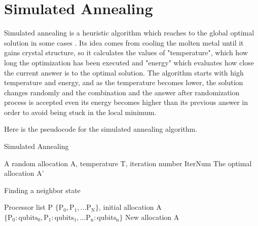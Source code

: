 \section{Simulated Annealing}
Simulated annealing is a heuristic algorithm which reaches to the global optimal solution in some cases \cite{simulatedannealing, Boltzmann}. Its idea comes from cooling the molten metal until it gains crystal structure, so it calculates the values of "temperature", which how long the optimization has been executed and "energy" which evaluates how close the current answer is to the optimal solution.  The algorithm starts with high temperature and energy, and as the temperature becomes lower,  the solution changes randomly and the combination and the answer after randomization process is accepted even its energy becomes higher than its previous answer in order to avoid being stuck in the local minimum.

Here is the pseudocode for the simulated annealing algorithm.

\begin{algorithm}
 \caption{Simulated Annealing}
  \begin{algorithmic}[1]
  \Require A random allocation A, temperature T, iteration number IterNum
  \Ensure The optimal allocation A'
    \EndIf
 \EndFor
\EndFunction
 \end{algorithmic}
 \end{algorithm}
 
 \begin{algorithm}
 \caption{Finding a neighbor state}
  \begin{algorithmic}[1]
\Require Processor list P $\{\operatorname{P_0}, \operatorname{P_1}, \dots \operatorname{P_N}\}$, initial allocation A  $\{\operatorname{P_0}:\operatorname{qubits_0}, \operatorname{P_1}:\operatorname{qubits_1}, \dots \operatorname{P_n}:\operatorname{qubits_n}\}$
 \Ensure New allocation A
\EndFunction
 \end{algorithmic}
 \end{algorithm}
  
